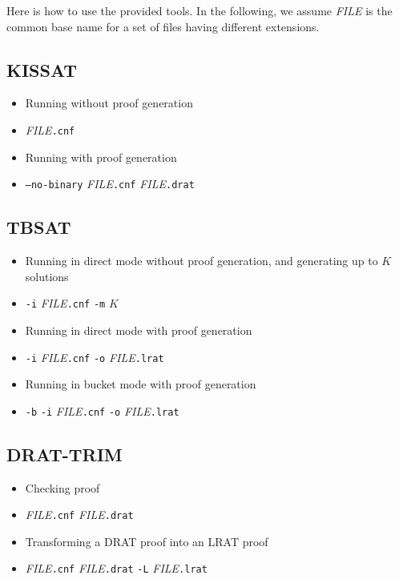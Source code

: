 Here is how to use the provided tools.  In the following, we assume
{\it FILE} is the common base name for a set of files having different extensions.

\subsection*{KISSAT}

\begin{itemize}
\item Running without proof generation
\item[] {\it FILE}\texttt{.cnf}
\item Running with proof generation
\item[] \texttt{--no-binary} {\it FILE}\texttt{.cnf} {\it FILE}\texttt{.drat}
\end{itemize}

\subsection*{TBSAT}

\begin{itemize}
\item Running in direct mode without proof generation, and generating up to $K$ solutions
\item[] \texttt{-i} {\it FILE}\texttt{.cnf} \texttt{-m} $K$
\item Running in direct mode with proof generation
\item[] \texttt{-i} {\it FILE}\texttt{.cnf} \texttt{-o} {\it FILE}\texttt{.lrat}
\item Running in bucket mode with proof generation
\item[] \texttt{-b} \texttt{-i} {\it FILE}\texttt{.cnf} \texttt{-o} {\it FILE}\texttt{.lrat}
\end{itemize}


\subsection*{DRAT-TRIM}

\begin{itemize}
\item Checking proof
\item[] {\it FILE}\texttt{.cnf} {\it FILE}\texttt{.drat}
\item Transforming a DRAT proof into an LRAT proof
\item[] {\it FILE}\texttt{.cnf} {\it FILE}\texttt{.drat} \texttt{-L} {\it FILE}\texttt{.lrat}
\end{itemize}

